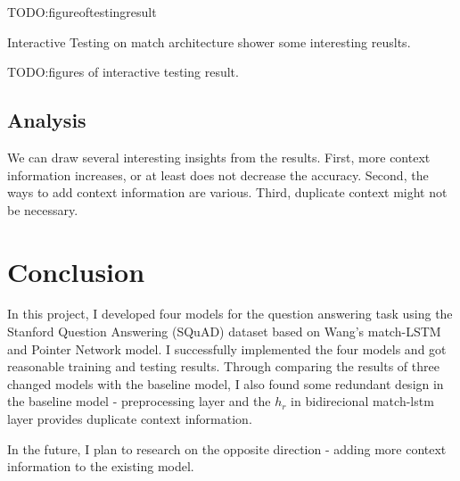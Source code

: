 \documentclass[modernstyle,12pt]{sjsuthesis}
\theoremstyle{definition}
\begin{document}
TODO:figureoftestingresult

Interactive Testing on match architecture shower some interesting reuslts.

TODO:figures of interactive testing result.

\section{Analysis}
We can draw several interesting insights from the results. First, more context information increases, or at least does not decrease the accuracy. Second, the ways to add context information are various. Third, duplicate context might not be necessary.





\chapter{Conclusion}

In this project, I developed four models for the question answering task using the Stanford Question Answering (SQuAD) dataset based on Wang's match-LSTM and Pointer Network model. I successfully implemented the four models and got reasonable training and testing results. Through comparing the results of three changed models with the baseline model, I also found some redundant design in the baseline model - preprocessing layer and the $h_r$ in bidirecional match-lstm layer provides duplicate context information.

In the future, I plan to research on the opposite direction - adding more context information to the existing model.



%
%
%





\end{document}
